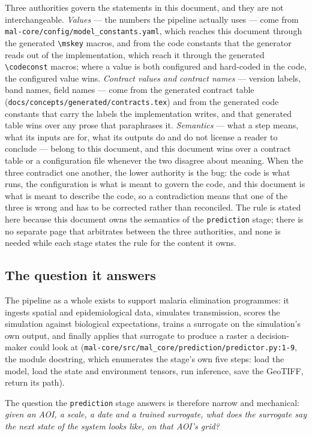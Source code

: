 \documentclass[11pt,a4paper]{article}
\newcommand{\code}[1]{\texttt{#1}}
\begin{document}
Three authorities govern the statements in this document, and they are not
interchangeable. \emph{Values} --- the numbers the pipeline actually uses ---
come from \code{mal-core/config/model\_constants.yaml}, which reaches this
document through the generated \code{\textbackslash mskey} macros, and from the
code constants that the generator reads out of the implementation, which
reach it through the generated \code{\textbackslash codeconst} macros; where a
value is both configured and hard-coded in the code, the configured value
wins. \emph{Contract values and
contract names} --- version labels, band names, field names --- come from the
generated contract table (\code{docs/concepts/generated/contracts.tex}) and
from the generated code constants that carry the labels the implementation
writes, and that generated table wins over any prose that paraphrases it.
\emph{Semantics} --- what a step means, what its inputs are for, what its
outputs do and do not license a reader to conclude --- belong to this
document, and this document wins over a contract table or a configuration
file whenever the two disagree about meaning. When the three contradict one
another, the lower authority is the bug: the code is what runs, the
configuration is what is meant to govern the code, and this document is what
is meant to describe the code, so a contradiction means that one of the three
is wrong and has to be corrected rather than reconciled. The rule is stated
here because this document owns the semantics of the \code{prediction} stage;
there is no separate page that arbitrates between the three authorities, and
none is needed while each stage states the rule for the content it owns.

\subsection{The question it answers}

The pipeline as a whole exists to support malaria elimination programmes: it
ingests spatial and epidemiological data, simulates transmission, scores the
simulation against biological expectations, trains a surrogate on the
simulation's own output, and finally applies that surrogate to produce a
raster a decision-maker could look at
(\code{mal-core/src/mal\_core/prediction/predictor.py:1-9}, the module
docstring, which enumerates the stage's own five steps: load the model, load
the state and environment tensors, run inference, save the GeoTIFF, return
its path).

The question the \code{prediction} stage answers is therefore narrow and
mechanical: \emph{given an AOI, a scale, a date and a trained surrogate, what
does the surrogate say the next state of the system looks like, on that AOI's
grid?}
\end{document}
